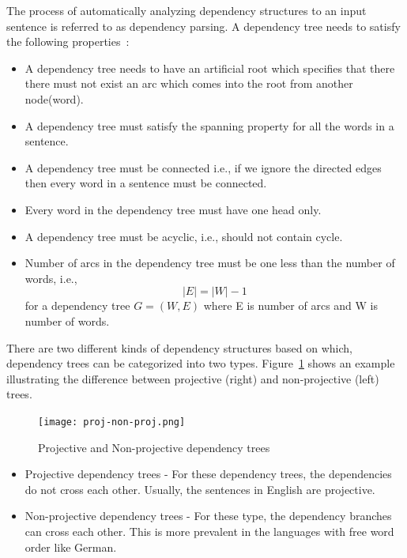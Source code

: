 The process of automatically analyzing dependency structures to an input sentence is referred to as dependency parsing. A dependency tree needs to satisfy the following properties~\cite{kubler2009dependency}:
\begin{itemize}
\item A dependency tree needs to have an artificial root which specifies that there there must not exist an arc which comes into the root from another node(word).
\item A dependency tree must satisfy the spanning property for all the words in a sentence.
\item A dependency tree must be connected i.e., if we ignore the directed edges then every word in a sentence must be connected.
\item Every word in the dependency tree must have one head only.
\item A dependency tree must be acyclic, i.e., should not contain cycle.
\item Number of arcs in the dependency tree must be one less than the number of words, i.e., $$|E| = |W| - 1$$ for a dependency tree $G = (W,E)$ where E is number of arcs and W is number of words.
\end{itemize}

There are two different kinds of dependency structures based on which, dependency trees can be categorized into two types. Figure~\ref{fig:proj-non-proj} shows an example illustrating the difference between projective (right) and non-projective (left) trees.  

\begin{figure}[!htb]
    \centering
    \texttt{[image: proj-non-proj.png]}
    \centering
    \caption{Projective and Non-projective dependency trees~\cite{kubler2009dependency}}
    \label{fig:proj-non-proj}
\end{figure}

\begin{itemize}
    \item Projective dependency trees - For these dependency trees, the dependencies do not cross each other. Usually, the sentences in English are projective.
    \item Non-projective dependency trees - For these type, the dependency branches can cross each other. This is more prevalent in the languages with free word order like German.
    
\end{itemize}


